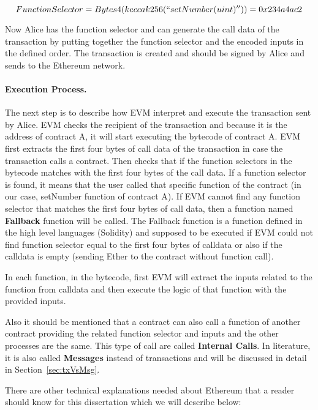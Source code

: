 \begin{equation}
    Function Selector = Bytes4(keccak256(``setNumber(uint)'')) = 0x234a4ac2
\end{equation}

Now Alice has the function selector and can generate the call data of the transaction by putting together the function selector and the encoded inputs in the defined order. The transaction is created and should be signed by Alice and sends to the Ethereum network.

\paragraph{Execution Process. } 
The next step is to describe how EVM interpret and execute the transaction sent by Alice. EVM checks the recipient of the transaction and because it is the address of contract A, it will start executing the bytecode of contract A. EVM first extracts the first four bytes of call data of the transaction in case the transaction calls a contract. Then checks that if the function selectors in the bytecode matches with the first four bytes of the call data. If a function selector is found, it means that the user called that specific function of the contract (in our case, setNumber function of contract A). If EVM cannot find any function selector that matches the first four bytes of call data, then a function named \textbf{Fallback} function will be called. The Fallback function is a function defined in the high level languages (\eg Solidity) and supposed to be executed if EVM could not find function selector equal to the first four bytes of calldata or also if the calldata is empty (\ie sending Ether to the contract without function call). 

In each function, in the bytecode, first EVM will extract the inputs related to the function from calldata and then execute the logic of that function with the provided inputs.

Also it should be mentioned that a contract can also call a function of another contract providing the related function selector and inputs and the other processes are the same. This type of call are called \textbf{Internal Calls}. In literature, it is also called \textbf{Messages} instead of transactions and will be discussed in detail in Section~\ref{sec:txVsMsg}.

There are other technical explanations needed about Ethereum that a reader should know for this dissertation which we will describe below:


